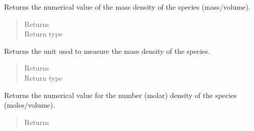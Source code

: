 \documentclass[letterpaper,10pt,openany,oneside,english]{sphinxmanual}
\begin{document}
\begin{fulllineitems}
\begin{fulllineitems}
\label{\detokenize{support_rst/specie:specie.Specie.massCC}}
Returns the numerical value of the mass density of the species
(mass/volume).
\begin{quote}\begin{description}
\item[{Returns}] \leavevmode
{}

\item[{Return type}] \leavevmode
{}

\end{description}\end{quote}

\end{fulllineitems}


\begin{fulllineitems}
\label{\detokenize{support_rst/specie:specie.Specie.massCCUnit}}
Returns the unit used to measure the mass density of the species.
\begin{quote}\begin{description}
\item[{Returns}] \leavevmode
{}

\item[{Return type}] \leavevmode
{}

\end{description}\end{quote}

\end{fulllineitems}


\begin{fulllineitems}
\label{\detokenize{support_rst/specie:specie.Specie.molarCC}}
Returns the numerical value for the number (molar) density of the
species (moles/volume).
\begin{quote}\begin{description}
\item[{Returns}] \leavevmode
{}


\end{description}
\end{quote}
\end{fulllineitems}
\end{fulllineitems}
\end{document}
